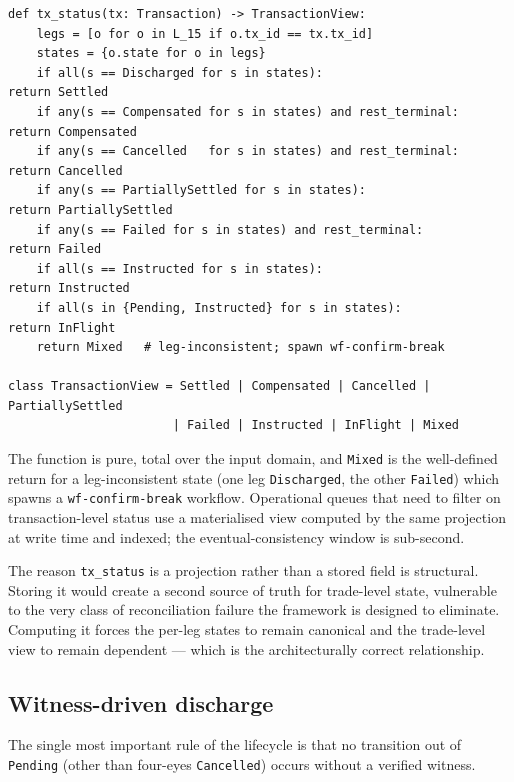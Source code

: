 \documentclass[11pt,a4paper]{article}
\begin{document}
\begin{lstlisting}
def tx_status(tx: Transaction) -> TransactionView:
    legs = [o for o in L_15 if o.tx_id == tx.tx_id]
    states = {o.state for o in legs}
    if all(s == Discharged for s in states):                          return Settled
    if any(s == Compensated for s in states) and rest_terminal:       return Compensated
    if any(s == Cancelled   for s in states) and rest_terminal:       return Cancelled
    if any(s == PartiallySettled for s in states):                    return PartiallySettled
    if any(s == Failed for s in states) and rest_terminal:            return Failed
    if all(s == Instructed for s in states):                          return Instructed
    if all(s in {Pending, Instructed} for s in states):               return InFlight
    return Mixed   # leg-inconsistent; spawn wf-confirm-break

class TransactionView = Settled | Compensated | Cancelled | PartiallySettled
                       | Failed | Instructed | InFlight | Mixed
\end{lstlisting}

The function is pure, total over the input domain, and \texttt{Mixed} is the well-defined return for a leg-inconsistent state (one leg \texttt{Discharged}, the other \texttt{Failed}) which spawns a \texttt{wf-confirm-break} workflow. Operational queues that need to filter on transaction-level status use a materialised view computed by the same projection at write time and indexed; the eventual-consistency window is sub-second.

The reason \texttt{tx\_status} is a projection rather than a stored field is structural. Storing it would create a second source of truth for trade-level state, vulnerable to the very class of reconciliation failure the framework is designed to eliminate. Computing it forces the per-leg states to remain canonical and the trade-level view to remain dependent --- which is the architecturally correct relationship.

\subsection{Witness-driven discharge}
\label{sec:witness-driven}

The single most important rule of the lifecycle is that no transition out of \texttt{Pending} (other than four-eyes \texttt{Cancelled}) occurs without a verified witness.
\end{document}
